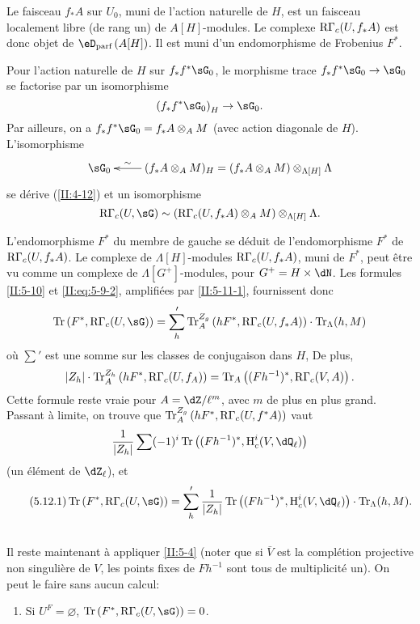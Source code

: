 Le faisceau $f_* A$ sur $U_0$, muni de l'action naturelle de $H$, est un 
faisceau localement libre (de rang un) de $A[H]$-modules. Le complexe 
$\mathrm{R}\Gamma_c(U,f_* A)$ est donc objet de $\eD_\text{parf}\left(A[H]\right)$. Il 
est muni d'un endomorphisme de Frobenius $F^*$. 

Pour l'action naturelle de $H$ sur $f_* f^*\sG_0$, le morphisme trace 
$f_* f^*\sG_0\to\sG_0$ se factorise par un isomorphisme 
\[
  \left(f_* f^*\sG_0\right)_H \to \sG_0 \text{.}
\]
Par ailleurs, on a $f_* f^*\sG_0=f_* A\otimes_A M$ (avec action diagonale de 
$H$). L'isomorphisme 
\[\xymatrix{
  \sG_0 
    & \ar[l]_-\sim (f_* A\otimes_A M)_H = (f_* A\otimes_A M)\otimes_{\Lambda[H]} \Lambda
}\]
se dérive (\ref{II:4-12}) et un isomorphisme 
\[
  \eR\Gamma_c(U,\sG) \sim \left(\eR\Gamma_c(U,f_* A)\otimes_A M\right)\otimes_{\Lambda[H]} \Lambda \text{.}
\]

L'endomorphisme $F^*$ du membre de gauche se déduit de l'endomorphisme 
$F^*$ de $\mathrm{R}\Gamma_c(U,f_* A)$. Le complexe de $\Lambda[H]$-modules 
$\mathrm{R}\Gamma_c(U,f_* A)$, muni de $F^*$, peut être vu comme un complexe de 
$\Lambda[G^+]$-modules, pour $G^+=H\times \dN$. Les formules \ref{II:5-10} 
et \eqref{II:eq:5-9-2}, amplifiées par \ref{II:5-11-1}, fournissent donc 
\[
  \tr\left(F^*,\eR\Gamma_c(U,\sG)\right) = \sum_h' \tr_A^{Z_g}\left(h F^*,\eR\Gamma_c(U,f_* A)\right)\cdot \tr_\Lambda(h,M)
\]
où $\sum'$ est une somme sur les classes de conjugaison dans $H$, De plus, 
\[
  |Z_h|\cdot \operatorname{Tr}_A^{Z_h}\left(h F^*,\mathrm{R}\Gamma_c(U,f_ A)\right) = \operatorname{Tr}_A\left((F h^{-1})^*,\mathrm{R}\Gamma_c(V,A)\right) \text{.}
\]
Cette formule reste vraie pour $A=\dZ/\ell^m$, avec $m$ de plus en plus grand. 
Passant à limite, on trouve que 
$\operatorname{Tr}_A^{Z_g}\left(h F^*,\mathrm{R}\Gamma_c(U,f^* A)\right)$ vaut 
\[
  \frac{1}{|Z_h|} \sum (-1)^i \tr\left((F h^{-1})^*,\h_c^i(V,\dQ_\ell)\right)
\]
(un élément de $\dZ_\ell$), et
\begin{equation*}\tag{5.12.1}\label{II:eq:5-12-1}
\tr\left(F^*,\eR\Gamma_c(U,\sG)\right) = \sum_h' \frac{1}{|Z_h|} \tr\left((F h^{-1})^*,\h_c^i(V,\dQ_\ell)\right)\cdot \tr_\Lambda(h,M) \text{.} 
\end{equation*}





\subsection{}\label{II:5-13}

Il reste maintenant à appliquer \ref{II:5-4} (noter que si $\bar V$ est la 
complétion projective non singulière de $V$, les points fixes de $F h^{-1}$ 
sont tous de multiplicité un). On peut le faire sans aucun calcul: 
\begin{enumerate}[\indent A.]
  \item Si $U^F=\varnothing$, $\tr\left(F^*,\eR\Gamma_c(U,\sG)\right) = 0$. 
\end{enumerate}

